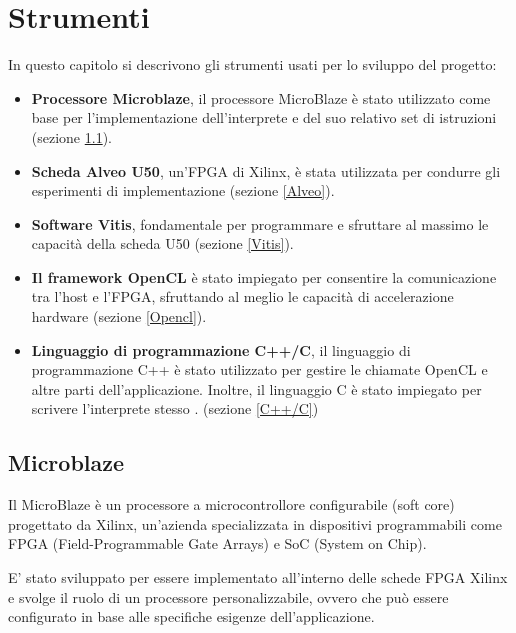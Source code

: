 \chapter{Strumenti}
In questo capitolo si descrivono gli strumenti usati per lo sviluppo del progetto: 
\begin{itemize}
    \item \textbf{Processore Microblaze}, il processore MicroBlaze è stato utilizzato come base per l'implementazione dell'interprete e del suo relativo set di istruzioni (sezione \ref{Microblaze}).
    \item \textbf{Scheda Alveo U50}, un'FPGA di Xilinx, è stata utilizzata per condurre gli esperimenti di implementazione  (sezione \ref{Alveo}).
    \item  \textbf{Software Vitis}, fondamentale per programmare e sfruttare al massimo le capacità della scheda U50  (sezione \ref{Vitis}).
    \item \textbf{Il framework OpenCL} è stato impiegato per consentire la comunicazione tra l'host e l'FPGA, sfruttando al meglio le capacità di accelerazione hardware (sezione \ref{Opencl}).
    \item \textbf{Linguaggio di programmazione C++/C}, il linguaggio di programmazione C++ è stato utilizzato per gestire le chiamate OpenCL e altre parti dell'applicazione. Inoltre, il linguaggio C è stato impiegato per scrivere l'interprete stesso . (sezione \ref{C++/C})
\end{itemize}

\clearpage 

\section{Microblaze}

\label{Microblaze}
Il MicroBlaze è un processore a microcontrollore configurabile (soft core) progettato da Xilinx, un'azienda specializzata in dispositivi programmabili come FPGA (Field-Programmable Gate Arrays) e SoC (System on Chip).

E' stato sviluppato per essere implementato all'interno delle schede FPGA Xilinx e svolge il ruolo di un processore personalizzabile, ovvero che può essere configurato in base alle specifiche esigenze dell'applicazione.

